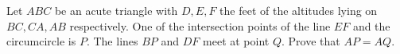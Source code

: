 Let $ABC$ be an acute triangle with $D, E, F$ the feet of the altitudes lying on $BC, CA, AB$ respectively. One of the intersection points of the line $EF$ and the circumcircle is $P$. The lines $BP$ and $DF$ meet at point $Q$. Prove that $AP = AQ$.
